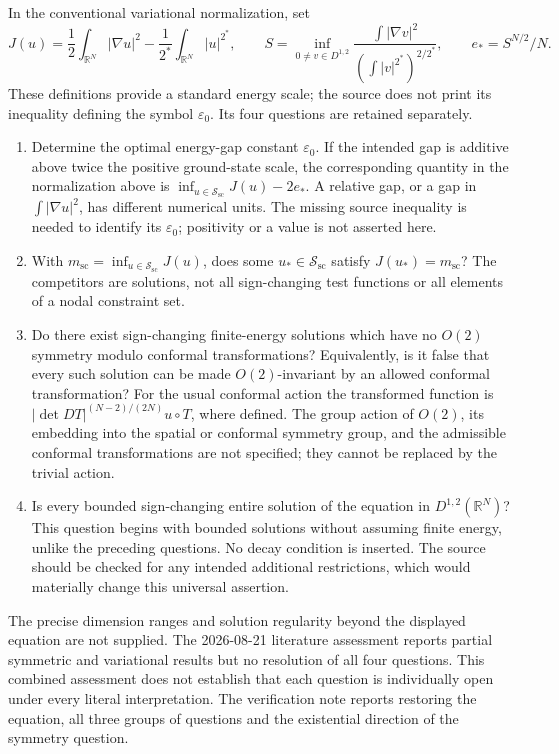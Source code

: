 \documentclass[11pt]{article}
\newcommand{\R}{\mathbb{R}}
\begin{document}
In the conventional variational normalization, set
\[
 J(u)=\frac12\int_{\R^N}|\nabla u|^2-
 \frac1{2^*}\int_{\R^N}|u|^{2^*},\qquad
 S=\inf_{0\ne v\in D^{1,2}}\frac{\int|\nabla v|^2}{(\int|v|^{2^*})^{2/2^*}},
 \qquad e_*=S^{N/2}/N.
\]
These definitions provide a standard energy scale; the source does not print its inequality defining the symbol \(\varepsilon_0\). Its four questions are retained separately.
\begin{enumerate}
\item Determine the optimal energy-gap constant \(\varepsilon_0\). If the intended gap is additive above twice the positive ground-state scale, the corresponding quantity in the normalization above is \(\inf_{u\in\mathcal S_{\mathrm{sc}}}J(u)-2e_*\). A relative gap, or a gap in \(\int|\nabla u|^2\), has different numerical units. The missing source inequality is needed to identify its \(\varepsilon_0\); positivity or a value is not asserted here.
\item With \(m_{\mathrm{sc}}=\inf_{u\in\mathcal S_{\mathrm{sc}}}J(u)\), does some \(u_*\in\mathcal S_{\mathrm{sc}}\) satisfy \(J(u_*)=m_{\mathrm{sc}}\)? The competitors are solutions, not all sign-changing test functions or all elements of a nodal constraint set.
\item Do there exist sign-changing finite-energy solutions which have no \(O(2)\) symmetry modulo conformal transformations? Equivalently, is it false that every such solution can be made \(O(2)\)-invariant by an allowed conformal transformation? For the usual conformal action the transformed function is \(|\det DT|^{(N-2)/(2N)}u\circ T\), where defined. The group action of \(O(2)\), its embedding into the spatial or conformal symmetry group, and the admissible conformal transformations are not specified; they cannot be replaced by the trivial action.
\item Is every bounded sign-changing entire solution of the equation in \(D^{1,2}(\R^N)\)? This question begins with bounded solutions without assuming finite energy, unlike the preceding questions. No decay condition is inserted. The source should be checked for any intended additional restrictions, which would materially change this universal assertion.
\end{enumerate}
The precise dimension ranges and solution regularity beyond the displayed equation are not supplied. The 2026-08-21 literature assessment reports partial symmetric and variational results but no resolution of all four questions. This combined assessment does not establish that each question is individually open under every literal interpretation. The verification note reports restoring the equation, all three groups of questions and the existential direction of the symmetry question.
\end{document}

